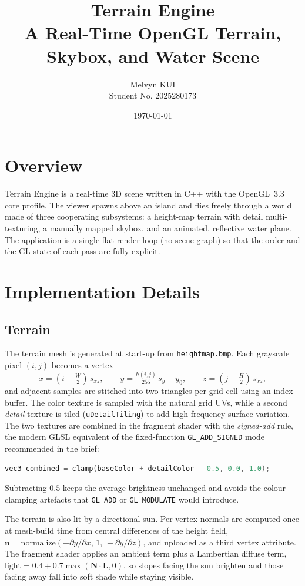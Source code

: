 \documentclass[11pt]{article}
\title{\textbf{Terrain Engine} \\ \large A Real-Time OpenGL Terrain, Skybox, and Water Scene}
\author{Melvyn KUI \\ Student No. 2025280173}
\date{\today}
\begin{document}
\maketitle

\section{Overview}

Terrain Engine is a real-time 3D scene written in C++ with the OpenGL~3.3 core
profile. The viewer spawns above an island and flies freely through a world made of
three cooperating subsystems: a height-map terrain with detail multi-texturing, a
manually mapped skybox, and an animated, reflective water plane. The application is a
single flat render loop (no scene graph) so that the order and the GL state of each
pass are fully explicit.

\section{Implementation Details}

\subsection{Terrain}
The terrain mesh is generated at start-up from \texttt{heightmap.bmp}. Each grayscale
pixel $(i,j)$ becomes a vertex
\[
x = (i - \tfrac{W}{2})\,s_{xz}, \qquad
y = \tfrac{h(i,j)}{255}\,s_{y} + y_{0}, \qquad
z = (j - \tfrac{H}{2})\,s_{xz},
\]
and adjacent samples are stitched into two triangles per grid cell using an index
buffer. The color texture is sampled with the natural grid UVs, while a second
\emph{detail} texture is tiled (\texttt{uDetailTiling}) to add high-frequency surface
variation. The two textures are combined in the fragment shader with the
\emph{signed-add} rule, the modern GLSL equivalent of the fixed-function
\texttt{GL\_ADD\_SIGNED} mode recommended in the brief:
\begin{lstlisting}[language=C]
vec3 combined = clamp(baseColor + detailColor - 0.5, 0.0, 1.0);
\end{lstlisting}
Subtracting $0.5$ keeps the average brightness unchanged and avoids the colour
clamping artefacts that \texttt{GL\_ADD} or \texttt{GL\_MODULATE} would introduce.

The terrain is also lit by a directional sun. Per-vertex normals are computed once at
mesh-build time from central differences of the height field,
$\mathbf{n}=\text{normalize}(-\partial y/\partial x,\,1,\,-\partial y/\partial z)$, and
uploaded as a third vertex attribute. The fragment shader applies an ambient term plus a
Lambertian diffuse term, $\text{light}=0.4+0.7\max(\mathbf{N}\!\cdot\!\mathbf{L},0)$, so
slopes facing the sun brighten and those facing away fall into soft shade while staying
visible.
\end{document}
